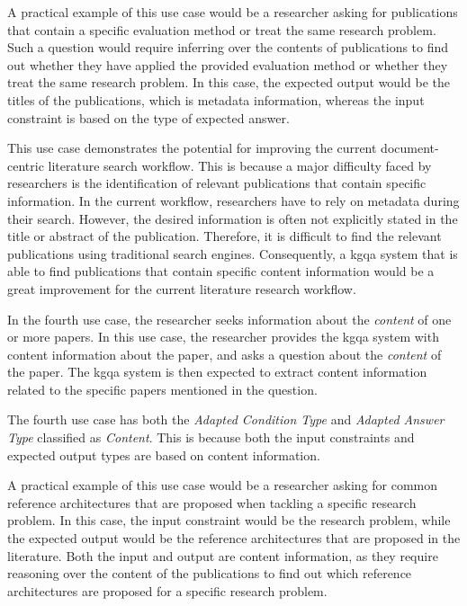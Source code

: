 A practical example of this use case would be a researcher asking for publications that contain a specific evaluation method or treat the same research problem. Such a question would require inferring over the contents of publications to find out whether they have applied the provided evaluation method or whether they treat the same research problem. In this case, the expected output would be the titles of the publications, which is metadata information, whereas the input constraint is based on the type of expected answer.

This use case demonstrates the potential for improving the current document-centric literature search workflow. This is because a major difficulty faced by researchers is the identification of relevant publications that contain specific information. In the current workflow, researchers have to rely on metadata during their search. However, the desired information is often not explicitly stated in the title or abstract of the publication. Therefore, it is difficult to find the relevant publications using traditional search engines. Consequently, a \gls{kgqa} system that is able to find publications that contain specific content information would be a great improvement for the current literature research workflow.

\begin{tcolorbox}[title=Use Case 4]
In the fourth use case, the researcher seeks information about the \emph{content} of one or more papers. In this use case, the researcher provides the \gls{kgqa} system with content information about the paper, and asks a question about the \emph{content} of the paper. The \gls{kgqa} system is then expected to extract content information related to the specific papers mentioned in the question.
\end{tcolorbox}

The fourth use case has both the \emph{Adapted Condition Type} and \emph{Adapted Answer Type} classified as \emph{Content}. This is because both the input constraints and expected output types are based on content information. 

A practical example of this use case would be a researcher asking for common reference architectures that are proposed when tackling a specific research problem. In this case, the input constraint would be the research problem, while the expected output would be the reference architectures that are proposed in the literature. Both the input and output are content information, as they require reasoning over the content of the publications to find out which reference architectures are proposed for a specific research problem.

